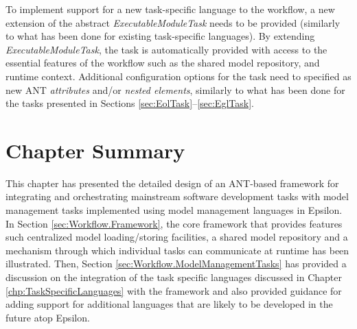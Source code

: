 To implement support for a new task-specific language to the workflow, a new extension of the abstract \emph{ExecutableModuleTask} needs to be provided (similarly to what has been done for existing task-specific languages). By extending \emph{ExecutableModuleTask}, the task is automatically provided with access to the essential features of the workflow such as the shared model repository, and runtime context. Additional configuration options for the task need to specified as new ANT \emph{attributes} and/or \emph{nested elements}, similarly to what has been done for the tasks presented in Sections \ref{sec:EolTask}--\ref{sec:EglTask}.

\section{Chapter Summary}

This chapter has presented the detailed design of an ANT-based framework for integrating and orchestrating mainstream software development tasks with model management tasks implemented using model management languages in Epsilon. In Section \ref{sec:Workflow.Framework}, the core framework that provides features such centralized model loading/storing facilities, a shared model repository and a mechanism through which individual tasks can communicate at runtime has been illustrated. Then, Section \ref{sec:Workflow.ModelManagementTasks} has provided a discussion on the integration of the task specific languages discussed in Chapter \ref{chp:TaskSpecificLanguages} with the framework and also provided guidance for adding support for additional languages that are likely to be developed in the future atop Epsilon.
